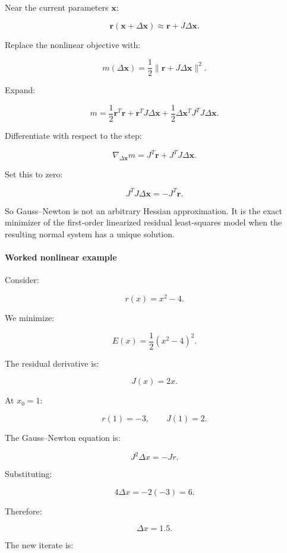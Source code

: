 \hypertarget{02-foundations-ii-ch027-deriving-gaussnewton-from-residual-linearization}{}

Near the current parameters \(\mathbf x\):

\[
\mathbf r(\mathbf x+\Delta\mathbf x) \approx \mathbf r+J\Delta\mathbf x.
\]

Replace the nonlinear objective with:

\[
m(\Delta\mathbf x) = \frac12\|\mathbf r+J\Delta\mathbf x\|^2.
\]

Expand:

\[
m= \frac12\mathbf r^T\mathbf r +\mathbf r^TJ\Delta\mathbf x +\frac12\Delta\mathbf x^TJ^TJ\Delta\mathbf x.
\]

Differentiate with respect to the step:

\[
\nabla_{\Delta\mathbf x}m = J^T\mathbf r+J^TJ\Delta\mathbf x.
\]

Set this to zero:

\[
\boxed{ J^TJ\Delta\mathbf x=-J^T\mathbf r }.
\]

So Gauss--Newton is not an arbitrary Hessian approximation. It is the exact minimizer of the first-order linearized residual least-squares model when the resulting normal system has a unique solution.

\paragraph{Worked nonlinear example}\label{02-foundations-ii-ch027-worked-nonlinear-example}

\hypertarget{02-foundations-ii-ch027-worked-nonlinear-example}{}

Consider:

\[
r(x)=x^2-4.
\]

We minimize:

\[
E(x)=\frac12(x^2-4)^2.
\]

The residual derivative is:

\[
J(x)=2x.
\]

At \(x_0=1\):

\[
r(1)=-3,\qquad J(1)=2.
\]

The Gauss--Newton equation is:

\[
J^2\Delta x=-Jr.
\]

Substituting:

\[
4\Delta x=-2(-3)=6.
\]

Therefore:

\[
\boxed{\Delta x=1.5}.
\]

The new iterate is:

